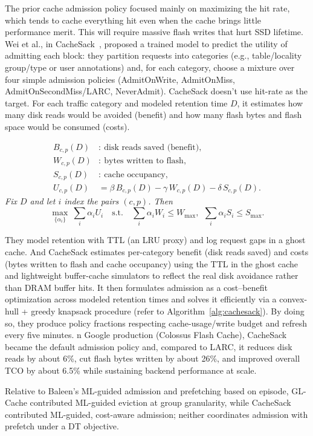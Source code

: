 The prior cache admission policy focused mainly on maximizing the hit rate, which tends to cache everything hit even when the cache brings little performance merit. This will require massive flash writes that hurt SSD lifetime. Wei et al., in CacheSack~\cite{yang2022cachesack}, proposed a trained model to predict the utility of admitting each block: they partition requests into categories (e.g., table/locality group/type or user annotations) and, for each category, choose a mixture over four simple admission policies (AdmitOnWrite, AdmitOnMiss, AdmitOnSecondMiss/LARC, NeverAdmit). CacheSack doesn’t use hit-rate as the target. For each traffic category and modeled retention time $D$, it estimates how many disk reads would be avoided (benefit) and how many flash bytes and flash space would be consumed (costs).

\[
\begin{aligned}
B_{c,p}(D) &:\ \text{disk reads saved (benefit)},\\
W_{c,p}(D) &:\ \text{bytes written to flash},\\
S_{c,p}(D) &:\ \text{cache occupancy},\\
U_{c,p}(D) &= \beta\,B_{c,p}(D)-\gamma\,W_{c,p}(D)-\delta\,S_{c,p}(D).
\end{aligned}
\]
\noindent\textit{Fix $D$ and let $i$ index the pairs $(c,p)$. Then}
\[
\max_{\{\alpha_i\}} \ \sum_i \alpha_i U_i
\quad \text{s.t.}\quad
\sum_i \alpha_i W_i \le W_{\max},\ \
\sum_i \alpha_i S_i \le S_{\max}.
\]


They model retention with TTL (an LRU proxy) and log request gaps in a ghost cache. And CacheSack estimates per-category benefit (disk reads saved) and costs (bytes written to flash and cache occupancy) using the TTL in the ghost cache and lightweight buffer-cache simulators to reflect the real disk avoidance rather than DRAM buffer hits. It then formulates admission as a cost–benefit optimization across modeled retention times and solves it efficiently via a convex-hull + greedy knapsack procedure (refer to Algorithm~\ref{alg:cachesack}). By doing so, they produce policy fractions respecting cache-usage/write budget and refresh every five minutes. n Google production (Colossus Flash Cache), CacheSack became the default admission policy and, compared to LARC, it reduces disk reads by about 6\%, cut flash bytes written by about 26\%, and improved overall TCO by about 6.5\% while sustaining backend performance at scale.


Relative to Baleen’s ML-guided admission and prefetching based on episode, GL-Cache contributed ML-guided eviction at group granularity, while CacheSack contributed ML-guided, cost-aware admission; neither coordinates admission with prefetch under a DT objective.

